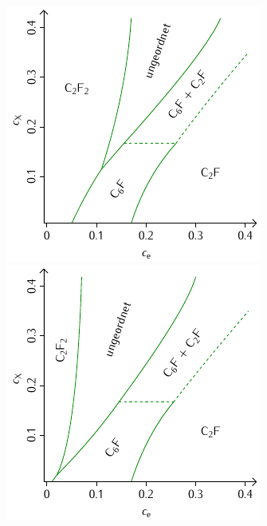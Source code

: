 \documentclass[a4paper, 10pt, twoside, openany]{book} %
\begin{document}
\begin{figure}
    \medskip

    \begin{minipage}[b]{0.48\textwidth}
        \includegraphics[width=\textwidth]{Abbildungen/Phasendiagramme/Schemata/F.pdf}
    \end{minipage}
    \hfill
    \begin{minipage}[b]{0.48\textwidth}
        \includegraphics[width=\textwidth]{Abbildungen/Phasendiagramme/Schemata/F_penalty.pdf}

\end{minipage}
\end{figure}
\end{document}

